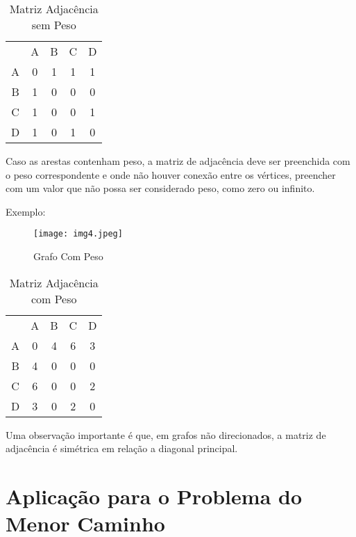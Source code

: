\begin{table}[h!]
	\centering
	\label{my-label}
	\begin{tabular}{ccccc}
		& A & B & C                      & D                      \\
		\multicolumn{1}{c|}{A} & 0 & 1 & \multicolumn{1}{c}{1} & \multicolumn{1}{c|}{1} \\
		\multicolumn{1}{c|}{B} & 1 & 0 & \multicolumn{1}{c}{0} & \multicolumn{1}{c|}{0} \\
		\multicolumn{1}{c|}{C} & 1 & 0 & \multicolumn{1}{c}{0} & \multicolumn{1}{c|}{1} \\
		\multicolumn{1}{c|}{D} & 1 & 0 & \multicolumn{1}{c}{1} & \multicolumn{1}{c|}{0}
	\end{tabular}
	\caption{Matriz Adjacência sem Peso}
\end{table}
\FloatBarrier
Caso as arestas contenham peso, a matriz de adjacência deve ser preenchida com o peso correspondente e onde não houver conexão entre os vértices, preencher com um valor que não possa ser considerado peso, como zero ou infinito.

Exemplo:

\begin{figure}[h!]
	\centering
	\texttt{[image: img4.jpeg]}
	\caption{Grafo Com Peso}
	\label{img4}
\end{figure}

\begin{table}[h!]
	\centering
	\label{my-label}
	\begin{tabular}{ccccc}
		& A & B & C                      & D                      \\
		\multicolumn{1}{c|}{A} & 0 & 4 & \multicolumn{1}{c}{6} & \multicolumn{1}{c|}{3} \\
		\multicolumn{1}{c|}{B} & 4 & 0 & \multicolumn{1}{c}{0} & \multicolumn{1}{c|}{0} \\
		\multicolumn{1}{c|}{C} & 6 & 0 & \multicolumn{1}{c}{0} & \multicolumn{1}{c|}{2} \\
		\multicolumn{1}{c|}{D} & 3 & 0 & \multicolumn{1}{c}{2} & \multicolumn{1}{c|}{0}
	\end{tabular}
	\caption{Matriz Adjacência com Peso}
\end{table}
\FloatBarrier
Uma observação importante é que, em grafos não direcionados, a matriz de adjacência é simétrica em relação a diagonal principal.

\section{Aplicação para o Problema do Menor Caminho}

